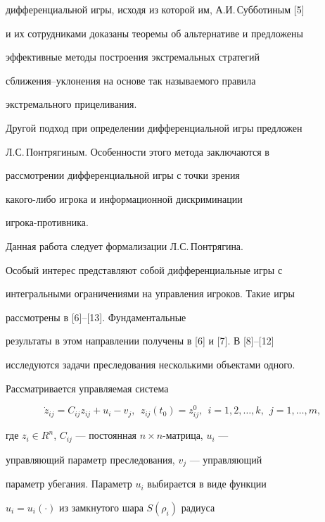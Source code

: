дифференциальной игры, исходя из которой им, А.И.\,Субботиным [5]


и их сотрудниками доказаны теоремы об альтернативе и предложены


эффективные методы построения экстремальных стратегий


сближения--уклонения на основе так называемого правила


экстремального прицеливания.





Другой подход при определении дифференциальной игры предложен


Л.С.\,Понтрягиным. Особенности этого метода заключаются в


рассмотрении дифференциальной игры с точки зрения


какого-либо игрока и информационной дискриминации


игрока-противника.





Данная работа следует формализации Л.С.\,Понтрягина.


Особый интерес представляют собой дифференциальные игры с


интегральными ограничениями на управления игроков. Такие игры


рассмотрены в [6]--[13]. Фундаментальные


результаты в этом направлении получены в [6] и [7]. В [8]--[12]


исследуются задачи преследования несколькими объектами одного.





Рассматривается управляемая система


\begin{equation}


\Dot z_{ij} = C_{ij}z_{ij} + u_i - v_j, \ \


z_{ij}(t_0) =z_{ij}^0, \ \ i=1,2,\dotsc,k, \ \ j=1,\dotsc,m,


\end{equation}


где $z_i \in R^n$, $C_{ij}$ --- постоянная $n\times n$-матрица, $u_i$ ---


управляющий параметр преследования, $v_j$ --- управляющий


параметр убегания. Параметр $u_i$ выбирается в виде функции


$u_i=u_i(\cdot)$ из замкнутого шара $S(\rho_i)$ радиуса


